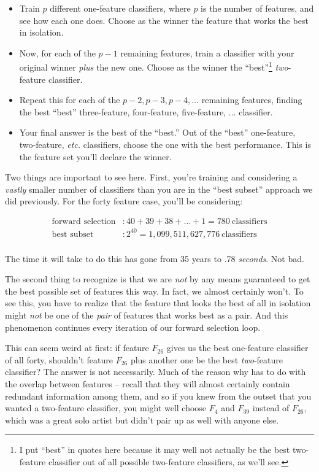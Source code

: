 \documentclass[12pt]{article}
\begin{document}
\begin{itemize}
\itemsep.1em
\item Train $p$ different one-feature classifiers, where $p$ is the number of
features, and see how each one does. Choose as the winner the feature that
works the best in isolation.
\item Now, for each of the $p-1$ remaining features, train a classifier with
your original winner \textit{plus} the new one. Choose as the winner the
``best''\footnote{I put ``best'' in quotes here because it may well not actually
be the best two-feature classifier out of all possible two-feature
classifiers, as we'll see.} \textit{two}-feature classifier.
\item Repeat this for each of the $p-2, p-3, p-4, \dots$ remaining features,
finding the best ``best'' three-feature, four-feature, five-feature, $\dots$
classifier.
\item Your final answer is the best of the ``best.'' Out of the ``best''
one-feature, two-feature, \textit{etc.} classifiers, choose the one with the
best performance. This is the feature set you'll declare the winner.
\end{itemize}

Two things are important to see here. First, you're training and considering a
\textit{vastly} smaller number of classifiers than you are in the ``best
subset'' approach we did previously. For the forty feature case, you'll be
considering:

\begin{align*}
\textrm{forward selection}&: 40 + 39 + 38 + \dots + 1 = 780\ \textrm{classifiers}\\
\textrm{best subset}&: 2^{40} = 1,099,511,627,776\ \textrm{classifiers}\\
\end{align*}

The time it will take to do this has gone from 35 years to .78
\textit{seconds}. Not bad.

The second thing to recognize is that we are \textit{not} by any means
guaranteed to get the best possible set of features this way. In fact, we
almost certainly won't. To see this, you have to realize that the feature that
looks the best of all in isolation might \textit{not} be one of the
\textit{pair} of features that works best as a pair. And this phenomenon
continues every iteration of our forward selection loop.

This can seem weird at first: if feature $F_{26}$ gives us the best
one-feature classifier of all forty, shouldn't feature $F_{26}$ plus another
one be the best \textit{two}-feature classifier? The answer is not
necessarily. Much of the reason why has to do with the overlap between
features -- recall that they will almost certainly contain redundant
information among them, and so if you knew from the outset that you wanted a
two-feature classifier, you might well choose $F_4$ and $F_{39}$ instead of
$F_{26}$, which was a great solo artist but didn't pair up as well with anyone
else.
\end{document}
